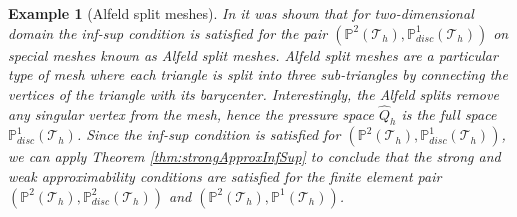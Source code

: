 \documentclass[USenglish]{article}
\theoremstyle{dgthm}
\theoremstyle{dgdef}
\newtheorem{example}{Example}
\begin{document}
\begin{example}[Alfeld split meshes]
  In \cite{ArnoldQin} it was shown that for two-dimensional domain the inf-sup condition is satisfied for the pair $\left(\mathbb{P}^2(\mathcal{T}_h),\mathbb{P}^1_{disc}(\mathcal{T}_h)\right)$ on special meshes known as Alfeld split meshes.
  Alfeld split meshes are a particular type of mesh where each triangle is split into three sub-triangles by connecting the vertices of the triangle with its barycenter.
  Interestingly, the Alfeld splits remove any singular vertex from the mesh, hence the pressure space $\hat{Q}_h$ is the full space $\mathbb{P}^1_{disc}(\mathcal{T}_h)$.
  Since the inf-sup condition is satisfied for $\left(\mathbb{P}^2(\mathcal{T}_h),\mathbb{P}^1_{disc}(\mathcal{T}_h)\right)$, we can apply Theorem \ref{thm:strongApproxInfSup} to conclude that the strong and weak approximability conditions are satisfied for the finite element pair $\left(\mathbb{P}^2(\mathcal{T}_h),\mathbb{P}^2_{disc}(\mathcal{T}_h)\right)$ and $\left(\mathbb{P}^2(\mathcal{T}_h),\mathbb{P}^1(\mathcal{T}_h)\right)$.
\end{example}

\end{document}
